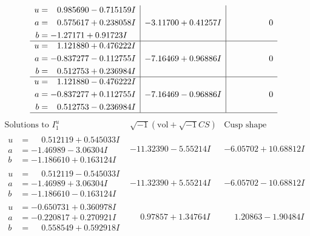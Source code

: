 \documentclass[1p]{elsarticle_modified}
\theoremstyle{definition}
\newcommand{\I}{\sqrt{-1}}
\begin{document}
$$\begin{array}{c|c|c}
\begin{aligned}
u &= \phantom{-}0.985690 - 0.715159 I \\
a &= \phantom{-}0.575617 + 0.238058 I \\
b &= -1.27171 + 0.91723 I\end{aligned}
 & -3.11700 + 0.41257 I & \phantom{-0.000000 } 0 \\ \hline\begin{aligned}
u &= \phantom{-}1.121880 + 0.476222 I \\
a &= -0.837277 - 0.112755 I \\
b &= \phantom{-}0.512753 + 0.236984 I\end{aligned}
 & -7.16469 + 0.96886 I & \phantom{-0.000000 } 0 \\ \hline\begin{aligned}
u &= \phantom{-}1.121880 - 0.476222 I \\
a &= -0.837277 + 0.112755 I \\
b &= \phantom{-}0.512753 - 0.236984 I\end{aligned}
 & -7.16469 - 0.96886 I & \phantom{-0.000000 } 0\\
 \hline 
 \end{array}$$\newpage$$\begin{array}{c|c|c}  
\text{Solutions to }I^u_{1}& \I (\text{vol} + \sqrt{-1}CS) & \text{Cusp shape}\\
 \hline 
\begin{aligned}
u &= \phantom{-}0.512119 + 0.545033 I \\
a &= -1.46989 - 3.06304 I \\
b &= -1.186610 + 0.163124 I\end{aligned}
 & -11.32390 - 5.55214 I & -6.05702 + 10.68812 I \\ \hline\begin{aligned}
u &= \phantom{-}0.512119 - 0.545033 I \\
a &= -1.46989 + 3.06304 I \\
b &= -1.186610 - 0.163124 I\end{aligned}
 & -11.32390 + 5.55214 I & -6.05702 - 10.68812 I \\ \hline\begin{aligned}
u &= -0.650731 + 0.360978 I \\
a &= -0.220817 + 0.270921 I \\
b &= \phantom{-}0.558549 + 0.592918 I\end{aligned}
 & \phantom{-}0.97857 + 1.34764 I & \phantom{-}1.20863 - 1.90484 I \\ \hline\begin{aligned}

\end{aligned}
\end{array}$$
\end{document}
